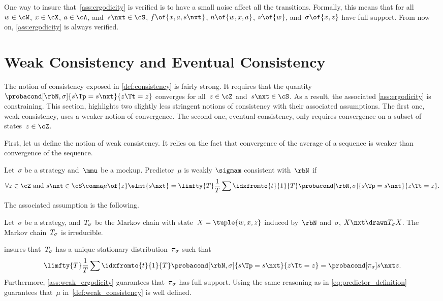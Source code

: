 One way to insure that~\cref{ass:ergodicity} is verified is to have a small noise affect all the transitions.
Formally, this means that for all~\(w \in \cW\), \(x \in \cX\), \(a \in \cA\), and~\(s\nxt \in \cS\), \(f \of{x, a, s\nxt}\), \(n \of{w, x, a}\), \(\nu \of{w}\), and~\(\sigma \of{x, z}\) have full support.
From now on, \cref{ass:ergodicity} is always verified.

\section{Weak Consistency and Eventual Consistency}
The notion of consistency exposed in \cref{def:consistency} is fairly strong.
It requires that the quantity~\(\probacond[\rbN, \sigma]{s\Tp = s\nxt}{z\Tt = z}\) converges for all~\(z \in \cZ\) and~\(s\nxt \in \cS\).
As a result, the associated \cref{ass:ergodicity} is constraining.
This section, highlights two slightly less stringent notions of consistency with their associated assumptions.
The first one, weak consistency, uses a weaker notion of convergence.
The second one, eventual consistency, only requires convergence on a subset of states~\(z \in \cZ\).

First, let us define the notion of weak consistency.
It relies on the fact that convergence of the average of a sequence is weaker than convergence of the sequence.

\begin{definition}
\label{def:weak_consistency}
Let~\(\sigma\) be a strategy and~\(\mmu\) be a mockup.
Predictor~\(\mu\) is weakly \(\sigmam\) consistent with~\(\rbN\) if
\[
\forall z \in \cZ \text{ and } s\nxt \in \cS\comma \mu \of{z} \elmt{s\nxt} = \limfty{T} \frac{1}{T} \sum\idxfromto{t}{1}{T} \probacond[\rbN, \sigma]{s\Tp = s\nxt}{z\Tt = z}.
\]
\end{definition}

The associated assumption is the following.

\begin{assumption}
\label{ass:weak_ergodicity}
Let~\(\sigma\) be a strategy, and~\(T_{\sigma}\) be the Markov chain with state~\(X = \tuple{w, x, z}\) induced by~\(\rbN\) and~\(\sigma\), \(X\nxt \drawn T\strat{\sigma} X\).
The Markov chain~\(T_{\sigma}\) is irreducible.
\end{assumption}
 insures that~\(T_{\sigma}\) has a unique stationary distribution~\(\pi_{\sigma}\) such that
\[
\limfty{T} \frac{1}{T} \sum\idxfromto{t}{1}{T} \probacond[\rbN, \sigma]{s\Tp = s\nxt}{z\Tt = z} = \probacond[\pi\strat{\sigma}]{s\nxt}{z}.
\]
Furthermore, \cref{ass:weak_ergodicity} guarantees that~\(\pi_{\sigma}\) has full support.
Using the same reasoning as in \cref{eq:predictor_definition} guarantees that~\(\mu\) in~\cref{def:weak_consistency} is well defined.

